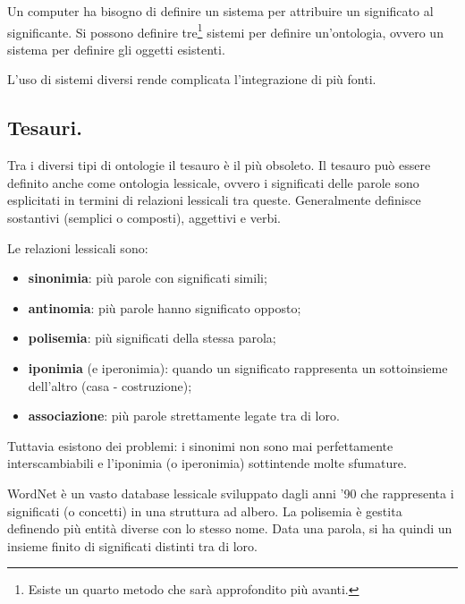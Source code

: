 \documentclass[11pt]{article}
\begin{document}
Un computer ha bisogno di definire un sistema per attribuire un significato al significante.
Si possono definire tre\footnote{Esiste un quarto metodo che sarà approfondito più avanti.} sistemi per definire un'ontologia, ovvero un sistema per definire gli oggetti esistenti.

L'uso di sistemi diversi rende complicata l'integrazione di più fonti.

\subsection{Tesauri.}
Tra i diversi tipi di ontologie il tesauro è il più obsoleto. Il tesauro può essere definito anche come ontologia lessicale, ovvero i significati delle parole sono esplicitati in termini di relazioni lessicali tra queste.
Generalmente definisce sostantivi (semplici o composti), aggettivi e verbi.

Le relazioni lessicali sono:
\begin{itemize}
  \item \textbf{sinonimia}: più parole con significati simili;
  \item \textbf{antinomia}: più parole hanno significato opposto;
  \item \textbf{polisemia}: più significati della stessa parola;
  \item \textbf{iponimia} (e iperonimia): quando un significato rappresenta un sottoinsieme dell'altro (casa - costruzione);
  \item \textbf{associazione}: più parole strettamente legate tra di loro.
\end{itemize}
Tuttavia esistono dei problemi: i sinonimi non sono mai perfettamente interscambiabili e l'iponimia (o iperonimia) sottintende molte sfumature.

WordNet è un vasto database lessicale sviluppato dagli anni '90 che rappresenta i significati (o concetti) in una struttura ad albero.
La polisemia è gestita definendo più entità diverse con lo stesso nome.
Data una parola, si ha quindi un insieme finito di significati distinti tra di loro.
\end{document}
